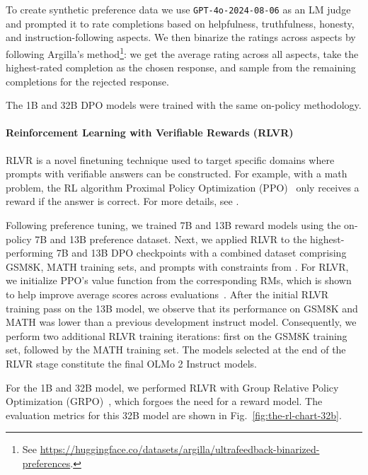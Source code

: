\documentclass[table]{ai2style/ai2}
\begin{document}
To create synthetic preference data we use \texttt{GPT-4o-2024-08-06} as an LM judge \citep{zheng2023judging} and prompted it to rate completions based on helpfulness, truthfulness, honesty, and instruction-following aspects.
We then binarize the ratings across aspects by following Argilla's method\footnote{See \url{https://huggingface.co/datasets/argilla/ultrafeedback-binarized-preferences}.}: we get the average rating across all aspects, take the highest-rated completion as the chosen response, and sample from the remaining completions for the rejected response.

The 1B and 32B DPO models were trained with the same on-policy methodology.

\paragraph{Reinforcement Learning with Verifiable Rewards (RLVR)} 
RLVR is a novel finetuning technique used to target specific domains where prompts with verifiable answers can be constructed.
For example, with a math problem, the RL algorithm Proximal Policy Optimization (PPO)~\citep{schulman2017proximal} only receives a reward if the answer is correct.
For more details, see \citet{lambert2024tulu3}.

Following preference tuning, we trained 7B and 13B reward models using the on-policy 7B and 13B preference dataset. 
Next, we applied RLVR to the highest-performing 7B and 13B DPO checkpoints with a combined dataset comprising GSM8K, MATH training sets, and prompts with constraints from \citet{lambert2024tulu3}. For RLVR, we initialize PPO's value function from the corresponding RMs, which is shown to help improve average scores across evaluations~\citep{lambert2024tulu3}. 
After the initial RLVR training pass on the 13B model, we observe that its performance on GSM8K and MATH was lower than a previous development instruct model. 
Consequently, we perform two additional RLVR training iterations: first on the GSM8K training set, followed by the MATH training set.  
The models selected at the end of the RLVR stage constitute the final OLMo 2 Instruct models. 

For the 1B and 32B model, we performed RLVR with Group Relative Policy Optimization (GRPO)~\citep{shao2024deepseekmath}, which forgoes the need for a reward model.
The evaluation metrics for this 32B model are shown in Fig.~\ref{fig:the-rl-chart-32b}.
\end{document}
